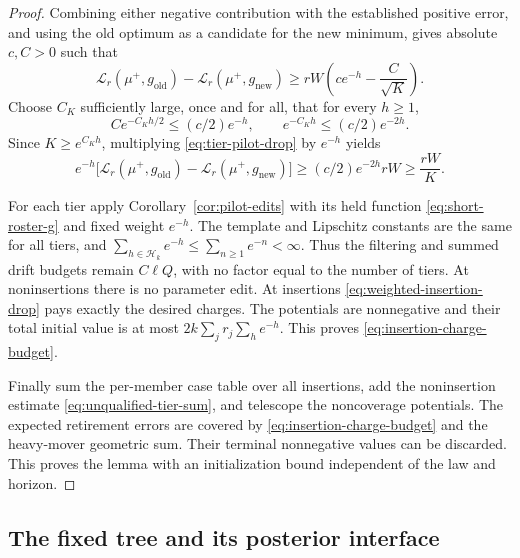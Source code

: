 \begin{proof}
Combining either negative contribution with the established positive
error, and using the old optimum as a candidate for the new minimum,
gives absolute \(c,C>0\) such that
\begin{equation}\label{eq:tier-pilot-drop}
 \mathcal L_r(\mu^+,g_{\mathrm{old}})
 -\mathcal L_r(\mu^+,g_{\mathrm{new}})
 \ge rW\left(ce^{-h}-\frac C{\sqrt K}\right).
\end{equation}
Choose \(C_K\) sufficiently large, once and for all, that for every
\(h\ge1\),
\[
 C e^{-C_Kh/2}\le(c/2)e^{-h},\qquad
 e^{-C_Kh}\le(c/2)e^{-2h}.
\]
Since \(K\ge e^{C_Kh}\), multiplying
\eqref{eq:tier-pilot-drop} by \(e^{-h}\) yields
\begin{equation}\label{eq:weighted-insertion-drop}
 e^{-h}\bigl[
 \mathcal L_r(\mu^+,g_{\mathrm{old}})
 -\mathcal L_r(\mu^+,g_{\mathrm{new}})\bigr]
 \ge(c/2)e^{-2h}rW\ge\frac{rW}{K}.
\end{equation}

For each tier apply Corollary~\ref{cor:pilot-edits} with its held
function \eqref{eq:short-roster-g} and fixed weight \(e^{-h}\).
The template and Lipschitz constants are the same for all tiers, and
\(\sum_{h\in\mathcal H_k}e^{-h}\le\sum_{n\ge1}e^{-n}<\infty\).
Thus the filtering and summed drift budgets remain \(C\ell Q\),
with no factor equal to the number of tiers.  At noninsertions there
is no parameter edit.  At insertions
\eqref{eq:weighted-insertion-drop} pays exactly the desired charges.
The potentials are nonnegative and their total initial value is at most
\(2k\sum_jr_j\sum_he^{-h}\).  This proves
\eqref{eq:insertion-charge-budget}.

Finally sum the per-member case table over all insertions, add the
noninsertion estimate \eqref{eq:unqualified-tier-sum}, and telescope the
noncoverage potentials.  The expected retirement errors are covered by
\eqref{eq:insertion-charge-budget} and the heavy-mover geometric sum.
Their terminal nonnegative values can be discarded.  This proves the
lemma with an initialization bound independent of the law and horizon.
\end{proof}

\subsection{The fixed tree and its posterior interface}

